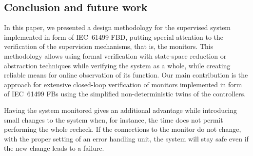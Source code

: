 \begin{bibunit}
%
%
%
%
%
%

\section{Conclusion and future work}
\label{sec:concl}

In this paper, we presented a design methodology for the supervised system implemented in form of IEC~61499 FBD, putting special attention to the verification of the supervision mechanisms, that is, the monitors. This methodology allows using formal verification with state-space reduction or abstraction techniques while verifying the system as a whole, while creating reliable means for online observation of its function. Our main contribution is the approach for extensive closed-loop verification of monitors implemented in form of IEC~61499 FBs using the simplified non-deterministic twins of the controllers.

Having the system monitored gives an additional advantage while introducing small changes to the system when, for instance, the time does not permit performing the whole recheck. If the connections to the monitor do not change, with the proper setting of an error handling unit, the system will stay safe even if the new change leads to a failure.


\end{bibunit}
